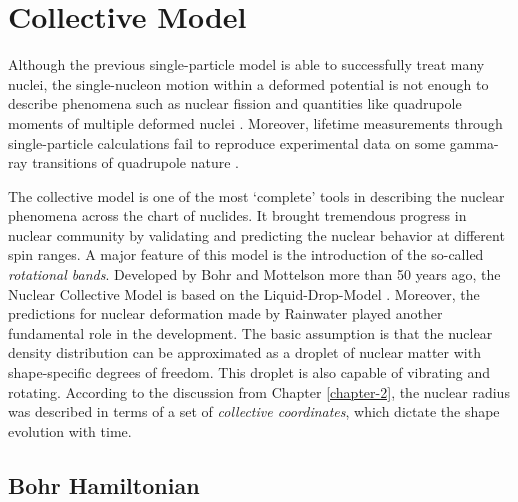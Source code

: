 \section{Collective Model}

Although the previous single-particle model is able to successfully treat many nuclei, the single-nucleon motion within a deformed potential is not enough to describe phenomena such as nuclear fission and quantities like quadrupole moments of multiple deformed nuclei \cite{townes1949nuclear}. Moreover, lifetime measurements through single-particle calculations fail to reproduce experimental data on some gamma-ray transitions of quadrupole nature \cite{goldhaber1951classification}. 

The collective model is one of the most `complete' tools in describing the nuclear phenomena across the chart of nuclides. It brought tremendous progress in nuclear community by validating and predicting the nuclear behavior at different spin ranges. A major feature of this model is the introduction of the so-called \emph{rotational bands}. Developed by Bohr and Mottelson \cite{bohr1953collective,bohr1998nuclear} more than 50 years ago, the Nuclear Collective Model is based on the Liquid-Drop-Model \cite{meitner1939disintegration,bohr1939mechanism,myers1974nuclear}. Moreover, the predictions for nuclear deformation made by Rainwater \cite{rainwater1950nuclear} played another fundamental role in the development. The basic assumption is that the nuclear density distribution can be approximated as a droplet of nuclear matter with shape-specific degrees of freedom. This droplet is also capable of vibrating and rotating. According to the discussion from Chapter \ref{chapter-2}, the nuclear radius was described in terms of a set of \emph{collective coordinates}, which dictate the shape evolution with time.

\subsection{Bohr Hamiltonian}

